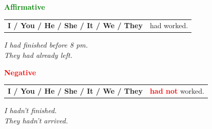 \documentclass[a4paper,10pt]{article}
\newcommand{\sectiontitle}[2]{%
  {\large\bfseries\textcolor{#1}{#2}}%
}
\begin{document}
\begin{minipage}[t]{.485\textwidth}
\begin{greenbox}
  \sectiontitle{Green}{Affirmative}

  \vspace{0.75mm}
  \begin{tabular}{@{}>{\bfseries}l l@{}}
    I / You / He / She / It / We / They & had worked.\\
    
  \end{tabular}

  \vspace{0.75mm}
  \textit{I had finished before 8 pm.}\\[-1mm]
  \textit{They had already left.}
\end{greenbox}
\end{minipage}
\hfill
\begin{minipage}[t]{.485\textwidth}
\begin{redbox}
  \sectiontitle{Red}{Negative}

  \vspace{0.75mm}
  \begin{tabular}{@{}>{\bfseries}l l@{}}
    I / You / He / She / It / We / They & \textcolor{Red}{\bfseries had not} worked.\\
    
  \end{tabular}

  \vspace{0.75mm}
  \textit{I hadn't finished.}\\[-1mm]
  \textit{They hadn't arrived.}
\end{redbox}
\end{minipage}

\vspace{1.35mm}
\end{document}
